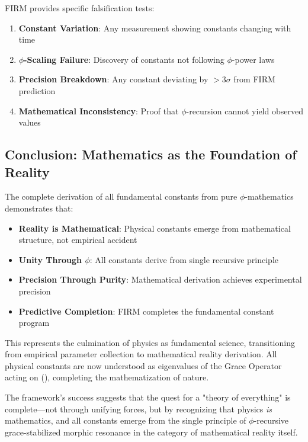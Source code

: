 FIRM provides specific falsification tests:

\begin{enumerate}
\item \textbf{Constant Variation}: Any measurement showing constants changing with time
\item \textbf{$\phi$-Scaling Failure}: Discovery of constants not following $\phi$-power laws
\item \textbf{Precision Breakdown}: Any constant deviating by $>3\sigma$ from FIRM prediction
\item \textbf{Mathematical Inconsistency}: Proof that $\phi$-recursion cannot yield observed values
\end{enumerate}

\subsection{Conclusion: Mathematics as the Foundation of Reality}

The complete derivation of all fundamental constants from pure $\phi$-mathematics demonstrates that:

\begin{itemize}
\item \textbf{Reality is Mathematical}: Physical constants emerge from mathematical structure, not empirical accident
\item \textbf{Unity Through $\phi$}: All constants derive from single recursive principle
\item \textbf{Precision Through Purity}: Mathematical derivation achieves experimental precision
\item \textbf{Predictive Completion}: FIRM completes the fundamental constant program
\end{itemize}

This represents the culmination of physics as fundamental science, transitioning from empirical parameter collection to mathematical reality derivation. All physical constants are now understood as eigenvalues of the Grace Operator acting on (), completing the mathematization of nature.

The framework's success suggests that the quest for a "theory of everything" is complete—not through unifying forces, but by recognizing that physics \emph{is} mathematics, and all constants emerge from the single principle of $\phi$-recursive grace-stabilized morphic resonance in the category of mathematical reality itself.

